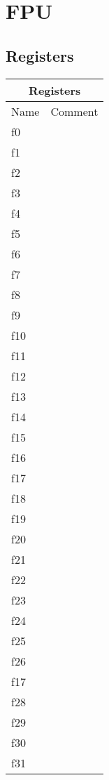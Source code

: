\chapter{FPU}

\section{Registers}

\begin{tabular}{ |p{3cm}|p{4cm}|  }
    \hline
    \multicolumn{2}{|c|}{Registers} \\
    \hline
    Name & Comment \\
    \hline
    f0  &  \\
    f1  &  \\
    f2  &  \\
    f3  &  \\
    f4  &  \\
    f5  &  \\
    f6  &  \\
    f7  &  \\
    f8  &  \\
    f9  &  \\
    f10 &  \\
    f11 &  \\
    f12 &  \\
    f13 &  \\
    f14 &  \\
    f15 &  \\
    f16 &  \\
    f17 &  \\
    f18 &  \\
    f19 &  \\
    f20 &  \\
    f21 &  \\
    f22 &  \\
    f23 &  \\
    f24 &  \\
    f25 &  \\
    f26 &  \\
    f17 &  \\
    f28 &  \\
    f29 &  \\
    f30 &  \\
    f31 &  \\
    
    \hline
\end{tabular}
